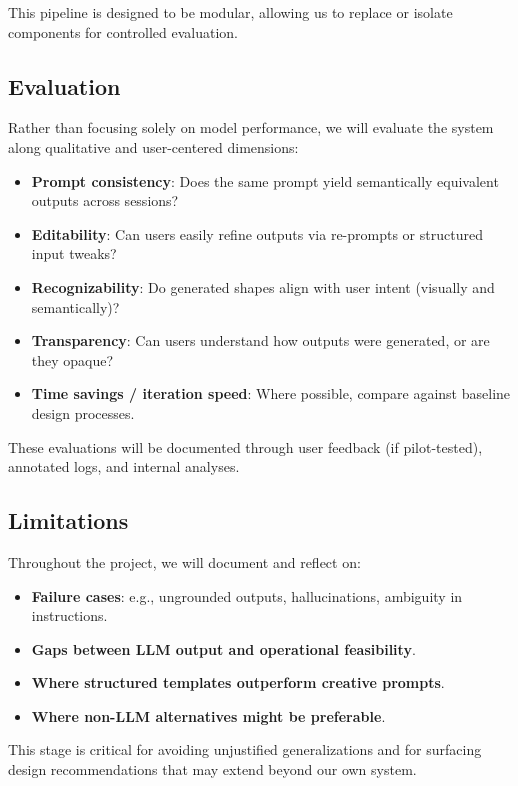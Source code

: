 This pipeline is designed to be modular, allowing us to replace or isolate components for controlled evaluation.

\subsection{Evaluation}
Rather than focusing solely on model performance, we will evaluate the system along qualitative and user-centered dimensions:
\begin{itemize}
  \item \textbf{Prompt consistency}: Does the same prompt yield semantically equivalent outputs across sessions?
  \item \textbf{Editability}: Can users easily refine outputs via re-prompts or structured input tweaks?
  \item \textbf{Recognizability}: Do generated shapes align with user intent (visually and semantically)?
  \item \textbf{Transparency}: Can users understand how outputs were generated, or are they opaque?
  \item \textbf{Time savings / iteration speed}: Where possible, compare against baseline design processes.
\end{itemize}

These evaluations will be documented through user feedback (if pilot-tested), annotated logs, and internal analyses.

\subsection{Limitations}
Throughout the project, we will document and reflect on:
\begin{itemize}
  \item \textbf{Failure cases}: e.g., ungrounded outputs, hallucinations, ambiguity in instructions.
  \item \textbf{Gaps between LLM output and operational feasibility}.
  \item \textbf{Where structured templates outperform creative prompts}.
  \item \textbf{Where non-LLM alternatives might be preferable}.
\end{itemize}

This stage is critical for avoiding unjustified generalizations and for surfacing design recommendations that may extend beyond our own system.

